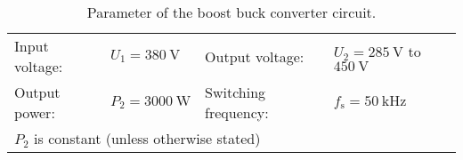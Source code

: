 
\begin{table}[ht]
    \centering  %
    \begin{tabular}{llll}
        \toprule
        
        Input voltage: &  $U_{\mathrm{1}} = \SI{380}{\volt}$ & Output voltage: & $U_{\mathrm{2}} = \SI{285}{\volt}$  to $\SI{450}{\volt}$\\ 
        Output power: & $P_{\mathrm{2}} = \SI{3000}{\watt}$ & Switching frequency: & $f_{\mathrm{s}} = \SI{50}{\kilo\hertz}$ \\ 
        \multicolumn{4}{l}{$P_{\mathrm{2}}$ is constant (unless otherwise stated)} \\
        \bottomrule
    \end{tabular}
    \caption{Parameter of the  boost buck converter circuit.}  %
    \label{table:ParametersOfBoostBuckConverter}
\end{table}